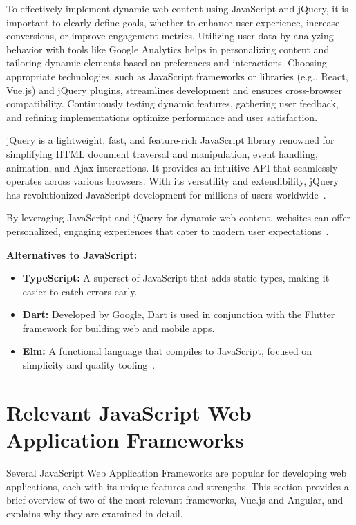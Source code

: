 To effectively implement dynamic web content using JavaScript and jQuery, it is important to clearly define goals, whether to enhance user experience, increase conversions, or improve engagement metrics. Utilizing user data by analyzing behavior with tools like Google Analytics helps in personalizing content and tailoring dynamic elements based on preferences and interactions. Choosing appropriate technologies, such as JavaScript frameworks or libraries (e.g., React, Vue.js) and jQuery plugins, streamlines development and ensures cross-browser compatibility. Continuously testing dynamic features, gathering user feedback, and refining implementations optimize performance and user satisfaction.

jQuery is a lightweight, fast, and feature-rich JavaScript library renowned for simplifying HTML document traversal and manipulation, event handling, animation, and Ajax interactions. It provides an intuitive API that seamlessly operates across various browsers. With its versatility and extendibility, jQuery has revolutionized JavaScript development for millions of users worldwide~\cite{jquery_history}.

By leveraging JavaScript and jQuery for dynamic web content, websites can offer personalized, engaging experiences that cater to modern user expectations~\cite{moldstud2024}.

\textbf{Alternatives to JavaScript:}
\begin{itemize}
    \item \textbf{TypeScript:} A superset of JavaScript that adds static types, making it easier to catch errors early.
    \item \textbf{Dart:} Developed by Google, Dart is used in conjunction with the Flutter framework for building web and mobile apps.
    \item \textbf{Elm:} A functional language that compiles to JavaScript, focused on simplicity and quality tooling~\cite{mdn-js-guide}.
\end{itemize}

\section{Relevant JavaScript Web Application Frameworks}

Several JavaScript Web Application Frameworks are popular for developing web applications, each with its unique features and strengths. This section provides a brief overview of two of the most relevant frameworks, Vue.js and Angular, and explains why they are examined in detail.

